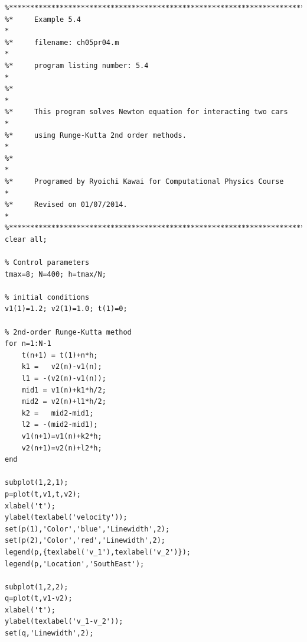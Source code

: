 \footnotesize
\begin{verbatim}
%**************************************************************************
%*     Example 5.4                                                        *
%*     filename: ch05pr04.m                                               *
%*     program listing number: 5.4                                        *
%*                                                                        *
%*     This program solves Newton equation for interacting two cars       *
%*     using Runge-Kutta 2nd order methods.                               *
%*                                                                        *
%*     Programed by Ryoichi Kawai for Computational Physics Course        *
%*     Revised on 01/07/2014.                                             *
%**************************************************************************
clear all;

% Control parameters
tmax=8; N=400; h=tmax/N;

% initial conditions
v1(1)=1.2; v2(1)=1.0; t(1)=0;

% 2nd-order Runge-Kutta method
for n=1:N-1
    t(n+1) = t(1)+n*h;
    k1 =   v2(n)-v1(n);
    l1 = -(v2(n)-v1(n));
    mid1 = v1(n)+k1*h/2;
    mid2 = v2(n)+l1*h/2;
    k2 =   mid2-mid1;
    l2 = -(mid2-mid1);
    v1(n+1)=v1(n)+k2*h;
    v2(n+1)=v2(n)+l2*h;
end

subplot(1,2,1); 
p=plot(t,v1,t,v2);
xlabel('t');
ylabel(texlabel('velocity'));
set(p(1),'Color','blue','Linewidth',2);
set(p(2),'Color','red','Linewidth',2);
legend(p,{texlabel('v_1'),texlabel('v_2')});
legend(p,'Location','SouthEast');

subplot(1,2,2);
q=plot(t,v1-v2);
xlabel('t');
ylabel(texlabel('v_1-v_2'));
set(q,'Linewidth',2);
\end{verbatim}
\normalsize


\bigskip
\noindent
\program
\label{prog:harmonic_oscillator1}

